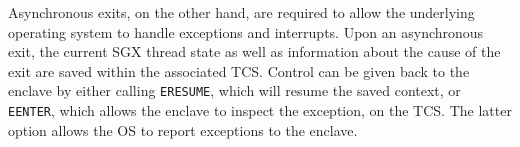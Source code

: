 Asynchronous exits, on the other hand, are required to allow the underlying operating system to handle exceptions and interrupts.
Upon an asynchronous exit, the current SGX thread state as well as information about the cause of the exit are saved within the associated TCS.
Control can be given back to the enclave by either calling \lstinline{ERESUME}, which will resume the saved context, or \lstinline{EENTER}, which allows the enclave to inspect the exception, on the TCS.
The latter option allows the OS to report exceptions to the enclave.
%
%
%
%
%
